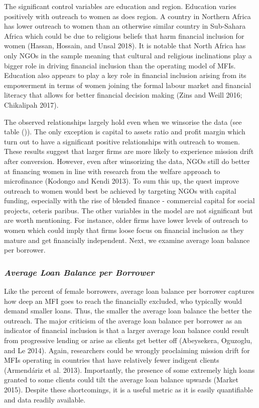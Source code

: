 \documentclass[
]{article}
\begin{document}
The significant control variables are education and region. Education
varies positively with outreach to women as does region. A country in
Northern Africa has lower outreach to women than an otherwise similar
country in Sub-Sahara Africa which could be due to religious beliefs
that harm financial inclusion for women (Hassan, Hossain, and Unsal
2018). It is notable that North Africa has only NGOs in the sample
meaning that cultural and religious inclinations play a bigger role in
driving financial inclusion than the operating model of MFIs. Education
also appears to play a key role in financial inclusion arising from its
empowerment in terms of women joining the formal labour market and
financial literacy that allows for better financial decision making
(Zins and Weill 2016; Chikalipah 2017).

The observed relationships largely hold even when we winsorise the data
(see table ()). The only exception is capital to assets ratio and profit
margin which turn out to have a significant positive relationships with
outreach to women. These results suggest that larger firms are more
likely to experience mission drift after conversion. However, even after
winsorizing the data, NGOs still do better at financing women in line
with research from the welfare approach to microfinance (Kodongo and
Kendi 2013). To sum this up, the quest improve outreach to women would
best be achieved by targeting NGOs with capital funding, especially with
the rise of blended finance - commercial capital for social projects,
ceteris paribus. The other variables in the model are not significant
but are worth mentioning. For instance, older firms have lower levels of
outreach to women which could imply that firms loose focus on financial
inclusion as they mature and get financially independent. Next, we
examine average loan balance per borrower.

\hypertarget{average-loan-balance-per-borrower}{%
\subsubsection{\texorpdfstring{\textbf{\emph{Average Loan Balance per
Borrower}}}{Average Loan Balance per Borrower}}\label{average-loan-balance-per-borrower}}

Like the percent of female borrowers, average loan balance per borrower
captures how deep an MFI goes to reach the financially excluded, who
typically would demand smaller loans. Thus, the smaller the average loan
balance the better the outreach. The major criticism of the average loan
balance per borrower as an indicator of financial inclusion is that a
larger average loan balance could result from progressive lending or
arise as clients get better off (Abeysekera, Oguzoglu, and Le 2014).
Again, researchers could be wrongly proclaiming mission drift for MFIs
operating in countries that have relatively fewer indigent clients
(Armendáriz et al. 2013). Importantly, the presence of some extremely
high loans granted to some clients could tilt the average loan balance
upwards (Market 2015). Despite these shortcomings, it is a useful metric
as it is easily quantifiable and data readily available.
\end{document}
